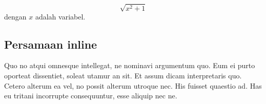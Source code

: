 \begin{equation}
\sqrt{x^2+1}
\end{equation}
    dengan $x$ adalah variabel.


\subsection{Persamaan inline}
\noindent Quo no atqui omnesque intellegat, ne nominavi argumentum quo. Eum ei purto oporteat dissentiet, soleat utamur an sit. Et assum dicam interpretaris quo. Cetero alterum ea vel, no possit alterum utroque nec. His fuisset quaestio ad. Has eu tritani incorrupte consequuntur, esse aliquip nec ne.
